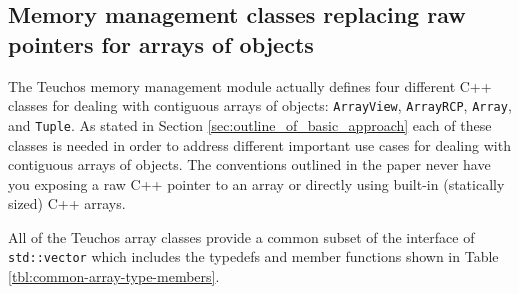 \documentclass[pdf,ps2pdf,11pt]{SANDreport}
\begin{document}
%
{}\subsection{Memory management classes replacing raw pointers for
arrays of objects}
\label{sec:array-classes}
%

The Teuchos memory management module actually defines four different
C++ classes for dealing with contiguous arrays of objects:
{}\texttt{ArrayView}, {}\texttt{ArrayRCP}, {}\texttt{Array}, and
{}\texttt{Tuple}.  As stated in Section
{}\ref{sec:outline_of_basic_approach} each of these classes is needed
in order to address different important use cases for dealing with
contiguous arrays of objects.  The conventions outlined in the paper
never have you exposing a raw C++ pointer to an array or directly
using built-in (statically sized) C++ arrays.

All of the Teuchos array classes provide a common subset of the
interface of {}\texttt{std::vector} which includes the typedefs and
member functions shown in Table {}\ref{tbl:common-array-type-members}.
\end{document}
